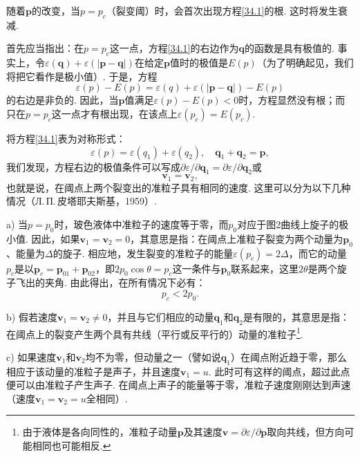 随着$\bm{p}$的改变，当$p=p_{c}$（裂变阈）时，会首次出现方程\eqref{34.1}的根. 这时将发生衰减.

首先应当指出：在$p=p_{c}$这一点，方程\eqref{34.1}的右边作为$\bm{q}$的函数是具有极值的. 事实上，令$\varepsilon(\bm{q})+\varepsilon(|\bm{p}-\bm{q}|)$在给定$\bm{p}$值时的极值是$E(p)$（为了明确起见，我们将把它看作是极小值）. 于是，方程
\begin{equation*}
\varepsilon(p)-E(p)=\varepsilon(q)+\varepsilon(|\bm{p}-\bm{q}|)-E(p)
\end{equation*}
的右边是非负的. 因此，当$\bm{p}$值满足$\varepsilon(p)-E(p)<0$时，方程显然没有根；而只在$p=p_{c}$这一点才有根出现，在该点上$\varepsilon(p_{c})=E(p_{c})$.

将方程\eqref{34.1}表为对称形式：
\begin{equation*}
\varepsilon(p)=\varepsilon(q_{1})+\varepsilon(q_{2}),\quad
\bm{q}_{1}+\bm{q}_{2}=\bm{p},
\end{equation*}
我们发现，方程右边的极值条件可以写成$\partial\varepsilon/\partial\bm{q}_{1}=\partial\varepsilon/\partial\bm{q}_{2}$或
\begin{equation}
\bm{v}_{1}=\bm{v}_{2},
\label{34.2}
\end{equation}
也就是说，在阈点上两个裂变出的准粒子具有相同的速度. 这里可以分为以下几种情况（Л.\,П.\,皮塔耶夫斯基，1959）.

a) 当$p=p_{0}$时，玻色液体中准粒子的速度等于零，而$p_{0}$对应于图2曲线上旋子的极小值. 因此，如果$\bm{v}_{1}=\bm{v}_{2}=0$，其意思是指：在阈点上准粒子裂变为两个动量为$\bm{p}_{0}$、能量为$\varDelta$的旋子. 相应地，发生裂变的准粒子的能量$\varepsilon(p_{c})=2\varDelta$，而它的动量$p_{c}$是以$\bm{p}_{c}=\bm{p}_{01}+\bm{p}_{02}$，即$2p_{0}\cos\theta=p_{c}$这一条件与$\bm{p}_{0}$联系起来，这里$2\theta$是两个旋子飞出的夹角. 由此得出，在所有情况下必有：
\begin{equation}
p_{c}<2p_{0}.
\label{34.3}
\end{equation}

b) 假若速度$\bm{v}_{1}=\bm{v}_{2}\neq0$，并且与它们相应的动量$\bm{q}_{1}$和$\bm{q}_{2}$是有限的，其意思是指：在阈点上的裂变产生两个具有共线（平行或反平行的）动量的准粒子\footnote{由于液体是各向同性的，准粒子动量$\bm{p}$及其速度$\bm{v}=\partial\varepsilon/\partial\bm{p}$取向共线，但方向可能相同也可能相反.}.

c) 如果速度$\bm{v}_{1}$和$\bm{v}_{2}$均不为零，但动量之一（譬如说$\bm{q}_{1}$）在阈点附近趋于零，那么相应于该动量的准粒子是声子，并且速度$\bm{v}_{1}=u$. 此时可有这样的阈点，超过此点便可以由准粒子产生声子. 在阈点上声子的能量等于零，准粒子速度刚刚达到声速（速度$\bm{v}_{1}=\bm{v}_{2}=u$全相同）.

